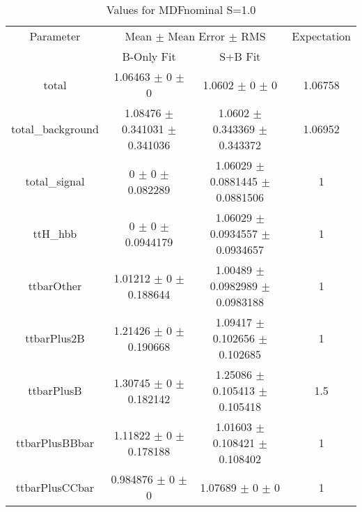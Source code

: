 \begin{table}
\centering
\caption{Values for MDFnominal S=1.0}
\begin{tabular}{cccc}
\toprule
Parameter & \multicolumn{2}{c}{Mean $\pm$ Mean Error $\pm$ RMS} & Expectation\\
 & B-Only Fit & S+B Fit & \\
\midrule
total & \num{1.06463} $\pm$ \num{0} $\pm$ \num{0} & \num{1.0602} $\pm$ \num{0} $\pm$ \num{0} & \num{1.06758}\\
total\_background & \num{1.08476} $\pm$ \num{0.341031} $\pm$ \num{0.341036} & \num{1.0602} $\pm$ \num{0.343369} $\pm$ \num{0.343372} & \num{1.06952}\\
total\_signal & \num{0} $\pm$ \num{0} $\pm$ \num{0.082289} & \num{1.06029} $\pm$ \num{0.0881445} $\pm$ \num{0.0881506} & \num{1}\\
ttH\_hbb & \num{0} $\pm$ \num{0} $\pm$ \num{0.0944179} & \num{1.06029} $\pm$ \num{0.0934557} $\pm$ \num{0.0934657} & \num{1}\\
ttbarOther & \num{1.01212} $\pm$ \num{0} $\pm$ \num{0.188644} & \num{1.00489} $\pm$ \num{0.0982989} $\pm$ \num{0.0983188} & \num{1}\\
ttbarPlus2B & \num{1.21426} $\pm$ \num{0} $\pm$ \num{0.190668} & \num{1.09417} $\pm$ \num{0.102656} $\pm$ \num{0.102685} & \num{1}\\
ttbarPlusB & \num{1.30745} $\pm$ \num{0} $\pm$ \num{0.182142} & \num{1.25086} $\pm$ \num{0.105413} $\pm$ \num{0.105418} & \num{1.5}\\
ttbarPlusBBbar & \num{1.11822} $\pm$ \num{0} $\pm$ \num{0.178188} & \num{1.01603} $\pm$ \num{0.108421} $\pm$ \num{0.108402} & \num{1}\\
ttbarPlusCCbar & \num{0.984876} $\pm$ \num{0} $\pm$ \num{0} & \num{1.07689} $\pm$ \num{0} $\pm$ \num{0} & \num{1}\\
\bottomrule
\end{tabular}
\end{table}